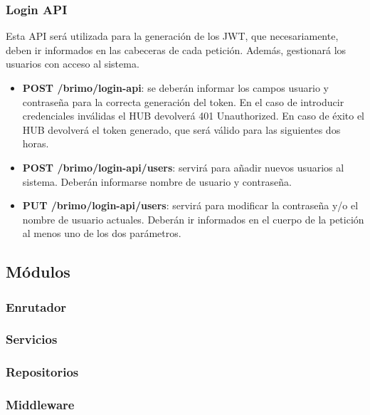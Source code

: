 \subsubsection{Login API}
Esta API será utilizada para la generación de los JWT, que necesariamente, deben ir informados en las cabeceras de cada petición. Además, gestionará
los usuarios con acceso al sistema.
\begin{itemize}
\item \textbf{POST /brimo/login-api}: se deberán informar los campos usuario y contraseña para la correcta generación del token. En el caso
de introducir credenciales inválidas el HUB devolverá 401 Unauthorized. En caso de éxito el HUB devolverá el token generado, que será válido
para las siguientes dos horas.
\item \textbf{POST /brimo/login-api/users}: servirá para añadir nuevos usuarios al sistema. Deberán informarse nombre de usuario y contraseña.
\item \textbf{PUT /brimo/login-api/users}: servirá para modificar la contraseña y/o el nombre de usuario actuales. Deberán ir informados en el
cuerpo de la petición al menos uno de los dos parámetros.
\end{itemize}

\subsection{Módulos}
\subsubsection{Enrutador}
\subsubsection{Servicios}
\subsubsection{Repositorios}
\subsubsection{Middleware}



